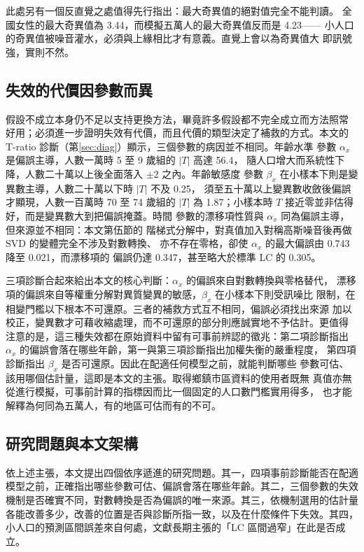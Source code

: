 \documentclass[UTF8, fontset=macnew, a4paper, 12pt]{ctexart}
\begin{document}
此處另有一個反直覺之處值得先行指出：最大奇異值的絕對值完全不能判讀。
全國女性的最大奇異值為 3.44，而模擬五萬人的最大奇異值反而是 4.23——
小人口的奇異值被噪音灌水，必須與上緣相比才有意義。直覺上會以為奇異值大
即訊號強，實則不然。

\subsection{失效的代價因參數而異}

假設不成立本身仍不足以支持更換方法，畢竟許多假設都不完全成立而方法照常
好用；必須進一步證明失效有代價，而且代價的類型決定了補救的方式。本文的
T-ratio 診斷（第\ref{sec:diag}）顯示，三個參數的病因並不相同。年齡水準
參數 $\alpha_x$ 是偏誤主導，人數一萬時 5 至 9 歲組的 $|T|$ 高達 56.4，
隨人口增大而系統性下降，人數二十萬以上後全面落入 $\pm2$ 之內。年齡敏感度
參數 $\beta_x$ 在小樣本下則是變異數主導，人數二十萬以下時 $|T|$ 不及 0.25，
須至五十萬以上變異數收斂後偏誤才顯現，人數一百萬時 70 至 74 歲組的 $|T|$
為 1.87；小樣本時 $T$ 接近零並非估得好，而是變異數大到把偏誤掩蓋。時間
參數的漂移項性質與 $\alpha_x$ 同為偏誤主導，但來源並不相同：本文第伍節的
階梯式分解中，對真值加入對稱高斯噪音後再做 SVD 的變體完全不涉及對數轉換、
亦不存在零格，卻使 $\alpha_x$ 的最大偏誤由 0.743 降至 0.021，而漂移項的
偏誤仍達 0.347，甚至略大於標準 LC 的 0.305。

三項診斷合起來給出本文的核心判斷：$\alpha_x$ 的偏誤來自對數轉換與零格替代，
漂移項的偏誤來自等權重分解對異質變異的敏感，$\beta_x$ 在小樣本下則受訊噪比
限制，在相變門檻以下根本不可還原。三者的補救方式互不相同，偏誤必須找出來源
加以校正，變異數才可藉收縮處理，而不可還原的部分則應誠實地不予估計。更值得
注意的是，這三種失效都在原始資料中留有可事前辨認的徵兆：第二項診斷指出
$\alpha_x$ 的偏誤會落在哪些年齡，第一與第三項診斷指出加權失衡的嚴重程度，
第四項診斷指出 $\beta_x$ 是否可還原。因此在配適任何模型之前，就能判斷哪些
參數可估、該用哪個估計量，這即是本文的主張。取得鄉鎮市區資料的使用者既無
真值亦無從進行模擬，可事前計算的指標因而比一個固定的人口數門檻實用得多，
也才能解釋為何同為五萬人，有的地區可估而有的不可。

\subsection{研究問題與本文架構}

依上述主張，本文提出四個依序遞進的研究問題。其一，四項事前診斷能否在配適
模型之前，正確指出哪些參數可估、偏誤會落在哪些年齡。其二，三個參數的失效
機制是否確實不同，對數轉換是否為偏誤的唯一來源。其三，依機制選用的估計量
各能改善多少，改善的位置是否與診斷所指一致，以及在什麼條件下失效。其四，
小人口的預測區間誤差來自何處，文獻長期主張的「LC 區間過窄」在此是否成立。
\end{document}
